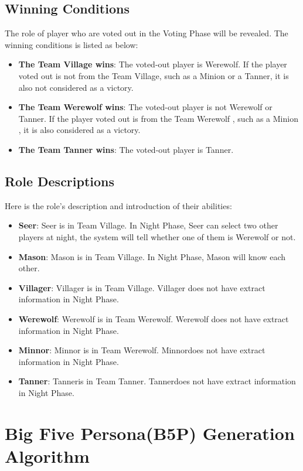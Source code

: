 \subsection{Winning Conditions}
The role of player who are voted out in the Voting Phase will be revealed. The winning conditions is listed as below:
\begin{itemize}
    \item \textbf{The Team Village wins}: The voted-out player is Werewolf. If the player voted out is not from the Team Village, such as a Minion or a Tanner, it is also not considered as a victory.
    \item \textbf{The Team Werewolf wins}: The voted-out player is not Werewolf or Tanner. If the player voted out is from the Team Werewolf , such as a Minion , it is also  considered as a victory.
    \item \textbf{The Team Tanner wins}: The voted-out player is Tanner.
\end{itemize}


\subsection{Role Descriptions}

Here is the role's description and introduction of their abilities:
\begin{itemize}
    \item \textbf{Seer}: Seer is in Team Village. In Night Phase, Seer can select two other players at night, the system will tell whether one of them is Werewolf or not. 
    \item \textbf{Mason}: Mason is in Team Village. In Night Phase, Mason will know each other.
    \item \textbf{Villager}: Villager is in Team Village. Villager does not have extract information in Night Phase.
    \item \textbf{Werewolf}: Werewolf is in Team Werewolf. Werewolf does not have extract information in Night Phase. 
    \item \textbf{Minnor}: Minnor is in Team Werewolf. Minnordoes not have extract information in Night Phase. 
    \item \textbf{Tanner}: Tanneris in Team Tanner. Tannerdoes not have extract information in Night Phase. 

\end{itemize}

\section{Big Five Persona(B5P) Generation Algorithm}
\label{sec:Appendix_B5PG}

